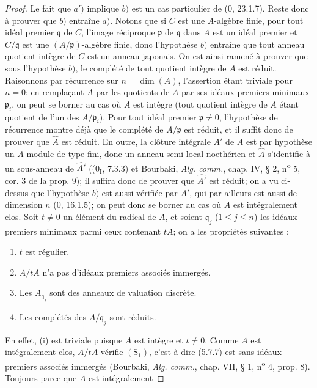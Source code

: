 \begin{proof}
Le fait que $a')$ implique $b)$ est un cas particulier de (0, 23.1.7). Reste
donc à prouver que $b)$ entraîne $a)$. Notons que si $C$ est une $A$-algèbre
finie, pour tout idéal premier $\mathfrak q$ de $C$, l'image réciproque
$\mathfrak p$ de $\mathfrak q$ dans $A$ est un idéal premier et
$C/\mathfrak q$ est une $(A/\mathfrak p)$-algèbre finie, donc l'hypothèse $b)$
entraîne que tout anneau quotient intègre de $C$ est un anneau japonais. On est
ainsi ramené à prouver que sous l'hypothèse $b)$, le complété de tout quotient
intègre de $A$ est réduit. Raisonnons par récurrence sur $n=\dim(A)$,
l'assertion étant triviale pour $n=0$; en remplaçant $A$ par les quotients de
$A$ par ses idéaux premiers minimaux $\mathfrak p_i$, on peut se borner au cas
où $A$ est intègre (tout quotient intègre de $A$ étant quotient de l'un des
$A/\mathfrak p_i$). Pour tout idéal premier $\mathfrak p\neq0$, l'hypothèse de
récurrence montre déjà que le complété de $A/\mathfrak p$ est réduit, et il
suffit donc de prouver que $\widehat A$ est réduit. En outre, la clôture
intégrale $A'$ de $A$ est par hypothèse un $A$-module de type fini, donc un
anneau semi-local noethérien et $\widehat A$ s'identifie à un sous-anneau de
$\widehat{A'}$ ((0$_{\mathrm I}$, 7.3.3) et Bourbaki, \emph{Alg. comm.}, chap.
IV, § 2, n\textsuperscript{o} 5, cor. 3 de la prop. 9); il suffira donc de
prouver que $\widehat{A'}$ est réduit; on a vu ci-dessus que l'hypothèse $b)$
est aussi vérifiée par $A'$, qui par ailleurs est aussi de dimension $n$
(0, 16.1.5); on peut donc se borner au cas où $A$ est intégralement clos. Soit
$t\neq0$ un élément du radical de $A$, et soient $\mathfrak q_j$
($1\leq j\leq n$) les idéaux premiers minimaux parmi ceux contenant $tA$; on a
les propriétés suivantes :
\begin{enumerate}
\item[\emph{(i)}] $t$ est régulier.
\item[\emph{(ii)}] $A/tA$ n'a pas d'idéaux premiers associés immergés.
\item[\emph{(iii)}] Les $A_{\mathfrak q_j}$ sont des anneaux de valuation
discrète.
\item[\emph{(iv)}] Les complétés des $A/\mathfrak q_j$ sont réduits.
\end{enumerate}
En effet, (i) est triviale puisque $A$ est intègre et $t\neq0$. Comme $A$ est
intégralement clos, $A/tA$ vérifie $(\mathrm S_1)$, c'est-à-dire (5.7.7) est
sans idéaux premiers associés immergés (Bourbaki, \emph{Alg. comm.}, chap. VII,
§ 1, n\textsuperscript{o} 4, prop. 8). Toujours parce que $A$ est
intégralement


\end{proof}
